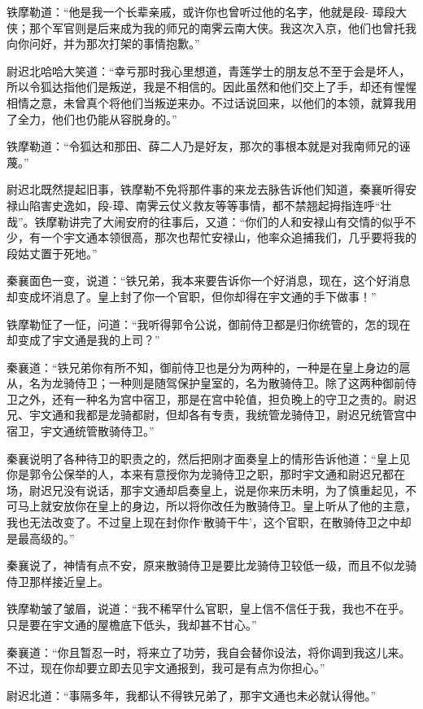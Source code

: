 \documentclass[12pt,oneside]{book}
\begin{document}
铁摩勒道：``他是我一个长辈亲戚，或许你也曾听过他的名字，他就是段-
璋段大侠；那个军官则是后来成为我的师兄的南霁云南大侠。我这次入京，他们也曾托我向你问好，并为那次打架的事情抱歉。''

尉迟北哈哈大笑道：``幸亏那时我心里想道，青莲学士的朋友总不至于会是坏人，所以令狐达指他们是叛逆，我是不相信的。因此虽然和他们交上了手，却还有惺惺相情之意，未曾真个将他们当叛逆来办。不过话说回来，以他们的本领，就算我用了全力，他们也仍能从容脱身的。''

铁摩勒道：``令狐达和那田、薛二人乃是好友，那次的事根本就是对我南师兄的诬蔑。''

尉迟北既然提起旧事，铁摩勒不免将那件事的来龙去脉告诉他们知道，秦襄听得安禄山陷害史逸如，段-璋、南霁云仗义救友等等事情，都不禁翘起拇指连呼``壮哉''。铁摩勒讲完了大闹安府的往事后，又道：``你们的人和安禄山有交情的似乎不少，有一个宇文通本领很高，那次也帮忙安禄山，他率众追捕我们，几乎要将我的段姑丈置于死地。''

秦襄面色一变，说道：``铁兄弟，我本来要告诉你一个好消息，现在，这个好消息却变成坏消息了。皇上封了你一个官职，但你却得在宇文通的手下做事！''

铁摩勒怔了一怔，问道：``我听得郭令公说，御前侍卫都是归你统管的，怎的现在却变成了宇文通是我的上司？''

秦襄道：``铁兄弟你有所不知，御前侍卫也是分为两种的，一种是在皇上身边的扈从，名为龙骑侍卫；一种则是随驾保护皇室的，名为散骑侍卫。除了这两种御前侍卫之外，还有一种名为宫中宿卫，那是在宫中轮值，担负晚上的守卫之责的。尉迟兄、宇文通和我都是龙骑都尉，但却各有专责，我统管龙骑侍卫，尉迟兄统管宫中宿卫，宇文通统管散骑侍卫。''

秦襄说明了各种待卫的职责之的，然后把刚才面奏皇上的情形告诉他道：``皇上见你是郭令公保举的人，本来有意授你为龙骑侍卫之职，那时宇文通和尉迟兄都在场，尉迟兄没有说话，那宇文通却启奏皇上，说是你来历未明，为了慎重起见，不可马上就安放你在皇上的身边，所以将你改任为散骑侍卫。皇上听从了他的主意，我也无法改变了。不过皇上现在封你作`散骑干牛'，这个官职，在散骑侍卫之中却是最高级的。''

秦襄说了，神情有点不安，原来散骑侍卫是要比龙骑侍卫较低一级，而且不似龙骑侍卫那样接近皇上。

铁摩勒皱了皱眉，说道：``我不稀罕什么官职，皇上信不信任于我，我也不在乎。只是要在宇文通的屋檐底下低头，我却甚不甘心。''

秦襄道：``你且暂忍一时，将来立了功劳，我自会替你设法，将你调到我这儿来。不过，现在你却要立即去见宇文通报到，我可是有点为你担心。''

尉迟北道：``事隔多年，我都认不得铁兄弟了，那宇文通也未必就认得他。''
\end{document}
